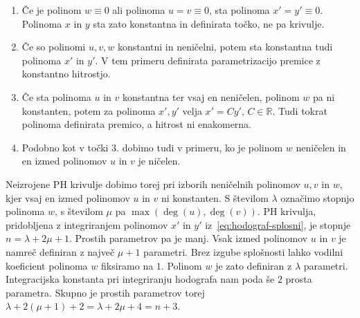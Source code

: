 \documentclass[isrm2, tisk]{fmfdelo}
\newcommand{\R}{\mathbb R}
\newcommand{\mycomment}[1]{\textbf{\textcolor{red}{#1}}}
\begin{document}
    \begin{enumerate}[wide, labelwidth=!, labelindent=10pt]
        \itemsep0em
        \item  Če je polinom $w\equiv 0$ ali polinoma $u=v \equiv 0$, sta polinoma $x'=y'\equiv 0$.
        Polinoma $x$ in $y$ sta zato konstantna in definirata točko, ne pa krivulje.
        \item  Če so polinomi $u,v,w$ konstantni in neničelni, potem sta konstantna tudi polinoma $x'$ in $y'$.
        V tem primeru definirata parametrizacijo premice z konstantno hitrostjo.
        \item  Če sta polinoma $u$ in $v$ konstantna ter vsaj en neničelen, polinom $w$ pa ni konstanten, potem za polinoma $x',y'$ velja $x'=Cy'$, $C\in \R$.
        Tudi tokrat polinoma definirata premico, a hitrost ni enakomerna.
        \item Podobno kot v točki 3. dobimo tudi v primeru, ko je polinom $w$ neničelen in en izmed polinomov $u$ in $v$ je ničelen.
    \end{enumerate}
    \noindent Neizrojene PH krivulje dobimo torej pri izborih neničelnih polinomov $u,v$ in $w$, kjer vsaj en izmed polinomov $u$ in $v$ ni konstanten.
    S številom $\lambda$ označimo stopnjo polinoma $w$, s številom $\mu$ pa $\max(\deg(u),\deg(v))$.
    PH krivulja, pridobljena z integriranjem polinomov $x'$ in $y'$ iz~\eqref{eq:hodograf-splosni}, je stopnje $n=\lambda + 2\mu + 1$.
    Prostih parametrov pa je manj.
    Vsak izmed polinomov $u$ in $v$ je namreč definiran z največ $\mu + 1$ parametri.
    Brez izgube splošnosti lahko vodilni koeficient polinoma $w$ fiksiramo na $1$.
    Polinom $w$ je zato definiran z $\lambda$ parametri.
    Integracijska konstanta pri integriranju hodografa nam poda še $2$ prosta parametra.
    Skupno je prostih parametrov torej $\lambda + 2(\mu+1)+2=\lambda + 2\mu+4 = n+3$.
\end{document}

